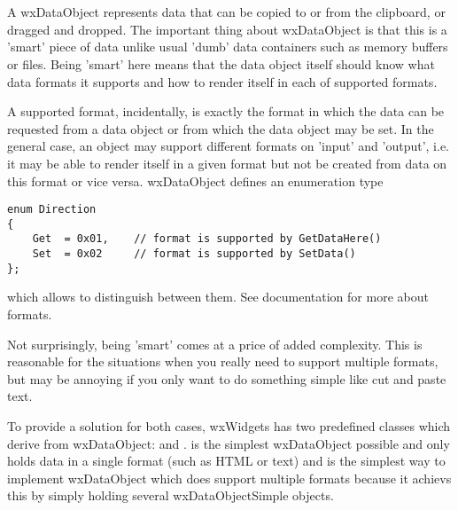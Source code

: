 
\section{}\label{wxdataobject}

A wxDataObject represents data that can be copied to or from the clipboard, or
dragged and dropped. The important thing about wxDataObject is that this is a
'smart' piece of data unlike usual 'dumb' data containers such as memory
buffers or files. Being 'smart' here means that the data object itself should
know what data formats it supports and how to render itself in each of
supported formats.

A supported format, incidentally, is exactly the format in which the data can
be requested from a data object or from which the data object may be set. In
the general case, an object may support different formats on 'input' and
'output', i.e. it may be able to render itself in a given format but not be
created from data on this format or vice versa. wxDataObject defines an
enumeration type

\begin{verbatim}
enum Direction
{
    Get  = 0x01,    // format is supported by GetDataHere()
    Set  = 0x02     // format is supported by SetData()
};
\end{verbatim}

which allows to distinguish between them. See 
 documentation for more about formats.

Not surprisingly, being 'smart' comes at a price of added complexity. This is
reasonable for the situations when you really need to support multiple formats,
but may be annoying if you only want to do something simple like cut and paste
text.

To provide a solution for both cases, wxWidgets has two predefined classes
which derive from wxDataObject:  and 
. 
 is
the simplest wxDataObject possible and only holds data in a single format (such
as HTML or text) and  is
the simplest way to implement wxDataObject which does support multiple formats
because it achievs this by simply holding several wxDataObjectSimple objects.

